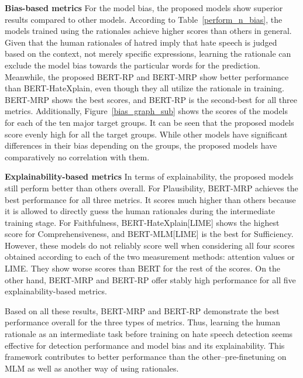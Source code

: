 \documentclass[11pt]{article}
\begin{document}
\begin{table*}[ht!]
{\begin{tabular}{lllr}
\end{tabular}
\caption{The highlighted words of the human rationale and the rationale of the models with detection results. BERT-HX is BERT-HateXplain. In the label column, the ground truth is of humans and the remaining labels are the predictions of each model. HS is 'hate speech,' OF is 'offensive,' and NO is 'normal.' More examples are in Appendix.}
\label{attention_vis_2}
}

\end{table*}


\noindent
\textbf{Bias-based metrics}  For the model bias, the proposed models show superior results compared to other models. According to Table~\ref{perform_n_bias}, the models trained using the rationales achieve higher scores than others in general. Given that the human rationales of hatred imply that hate speech is judged based on the context, not merely specific expressions, learning the rationale can exclude the model bias towards the particular words for the prediction. Meanwhile, the proposed BERT-RP and BERT-MRP show better performance than BERT-HateXplain, even though they all utilize the rationale in training. BERT-MRP shows the best scores, and BERT-RP is the second-best for all three metrics. Additionally, Figure~\ref{bias_graph_sub} shows the scores of the models for each of the ten major target groups. It can be seen that the proposed models score evenly high for all the target groups. While other models have significant differences in their bias depending on the groups, the proposed models have comparatively no correlation with them. 

\noindent
\textbf{Explainability-based metrics}  In terms of explainability, the proposed models still perform better than others overall. For Plausibility, BERT-MRP achieves the best performance for all three metrics. It scores much higher than others because it is allowed to directly guess the human rationales during the intermediate training stage. For Faithfulness, BERT-HateXplain[LIME] shows the highest score for Comprehensiveness, and BERT-MLM[LIME] is the best for Sufficiency. However, these models do not reliably score well when considering all four scores obtained according to each of the two measurement methods: attention values or LIME. They show worse scores than BERT for the rest of the scores. On the other hand, BERT-MRP and BERT-RP offer stably high performance for all five explainability-based metrics. 

Based on all these results, BERT-MRP and BERT-RP demonstrate the best performance overall for the three types of metrics. Thus, learning the human rationale as an intermediate task before training on hate speech detection seems effective for detection performance and model bias and its explainability. This framework contributes to better performance than the other--pre-finetuning on MLM as well as another way of using rationales. 
\end{document}
